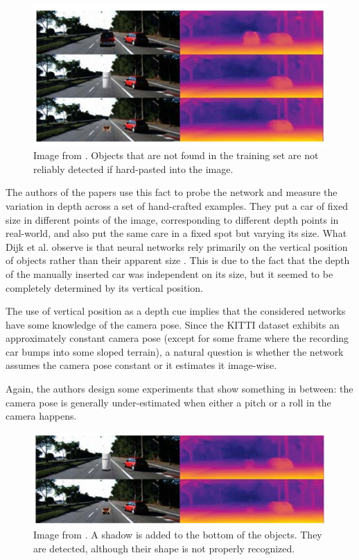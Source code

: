 \begin{figure}
    \centering
    \includegraphics[width=1.\textwidth]{figs/object_disappearing}
    \caption{
        Image from \cite{Dijk}.
        Objects that are not found in the training set are not reliably detected if hard-pasted into the image.
        \label{fig:object_disappearing}
    }
\end{figure}

The authors of the papers use this fact to probe the network and measure the variation in depth across a set of hand-crafted examples.
They put a car of fixed size in different points of the image, corresponding to different depth points in real-world, and also put the same care in a fixed spot but varying its size.
What Dijk et al. observe is that neural networks rely primarily on the vertical position of objects rather than their apparent size \cite{Dijk}.
This is due to the fact that the depth of the manually inserted car was independent on its size, but it seemed to be completely determined by its vertical position.

The use of vertical position as a depth cue implies that the considered networks have some knowledge of the camera pose.
Since the KITTI dataset exhibits an approximately constant camera pose (except for some frame where the recording car bumps into some sloped terrain), a natural question is whether the network assumes the camera pose constant or it estimates it image-wise.

Again, the authors design some experiments that show something in between: the camera pose is generally under-estimated when either a pitch or a roll in the camera happens.


\begin{figure}
    \centering
    \includegraphics[width=1.\textwidth]{figs/object_appearing}
    \caption{
        Image from \cite{Dijk}.
        A shadow is added to the bottom of the objects.
        They are detected, although their shape is not properly recognized.
        \label{fig:object_appearing}
    }
\end{figure}

